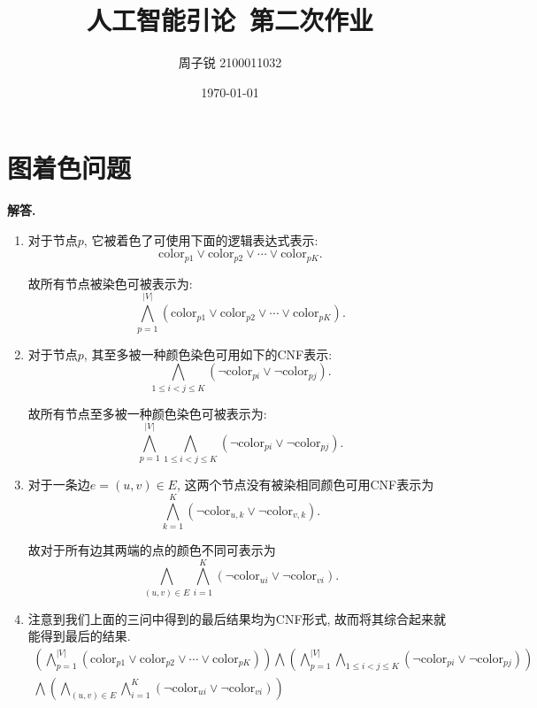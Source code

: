 \documentclass[11pt]{article}
\newenvironment{solution}{\par\noindent\textbf{解答. }}{\par}
\newcommand{\co}{\mathrm{color}}
\begin{document}
	
	\title{\textbf{人工智能引论\ 第二次作业}}
	\author{周子锐 2100011032}
	\date{\today}
	\maketitle

	\section{图着色问题}
	\begin{solution}

	\end{solution}
	\begin{enumerate}[(1)]
		\item 对于节点$p$, 它被着色了可使用下面的逻辑表达式表示: $$\co_{p1}\vee\co_{p2}\vee\cdots\vee\co_{pK}.$$
		
		故所有节点被染色可被表示为: $$\bigwedge_{p=1}^{|V|} (\co_{p1}\vee\co_{p2}\vee\cdots\vee\co_{pK}).$$

		\item 对于节点$p$, 其至多被一种颜色染色可用如下的CNF表示: $$\bigwedge_{1\leq i<j\leq K}(\neg\co_{pi}\vee\neg\co_{pj}).$$
		
		故所有节点至多被一种颜色染色可被表示为: $$\bigwedge_{p=1}^{|V|}\bigwedge_{1\leq i<j\leq K}(\neg\co_{pi}\vee\neg\co_{pj}).$$

		\item 对于一条边$e=(u,v)\in E$, 这两个节点没有被染相同颜色可用CNF表示为 $$\bigwedge_{k=1}^K (\neg\co_{u,k}\vee\neg\co_{v,k}).$$
		
		故对于所有边其两端的点的颜色不同可表示为 $$\bigwedge_{(u,v)\in E}\bigwedge_{i=1}^K (\neg\co_{ui}\vee\neg\co_{vi}).$$

		\item 注意到我们上面的三问中得到的最后结果均为CNF形式, 故而将其综合起来就能得到最后的结果. $$\begin{aligned}
			\left(\bigwedge_{p=1}^{|V|} (\co_{p1}\vee\co_{p2}\vee\cdots\vee\co_{pK})\right)\bigwedge\left( \bigwedge_{p=1}^{|V|}\bigwedge_{1\leq i<j\leq K}(\neg\co_{pi}\vee\neg\co_{pj})\right) \\
			\bigwedge \left(\bigwedge_{(u,v)\in E}\bigwedge_{i=1}^K (\neg\co_{ui}\vee\neg\co_{vi})\right)
		\end{aligned}$$
	\end{enumerate}
\end{document}
